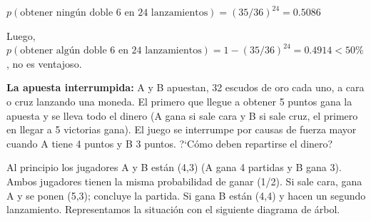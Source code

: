 $p(\text{obtener ningún doble 6 en 24 lanzamientos})=(35/36)^{24}=0.5086$

Luego, $p(\text{obtener algún doble 6 en 24 lanzamientos})=1-(35/36)^{24}=0.4914<50\%$, no es ventajoso.


\vspace{5mm}
\begin{ejemplo}
\begin{ejer}
\textbf{La apuesta interrumpida:} A y B apuestan, 32 escudos de oro cada uno, a cara o cruz lanzando una moneda. El primero que llegue a obtener 5 puntos gana la apuesta y se lleva todo el dinero (A gana si sale cara y B si sale cruz, el primero en llegar a 5 victorias gana). El juego se interrumpe por causas de fuerza mayor cuando A tiene 4 puntos y B 3 puntos. ?`Cómo deben repartirse el dinero?
\end{ejer}
\end{ejemplo}

Al principio los jugadores A y B están (4,3) (A gana 4 partidas y B gana 3). Ambos jugadores tienen la misma probabilidad de ganar (1/2). Si sale cara, gana A y se ponen (5,3); concluye la partida. Si gana B están (4,4) y hacen un segundo lanzamiento. Representamos la situación con el siguiente diagrama de árbol.

\begin{center}
\end{center}

